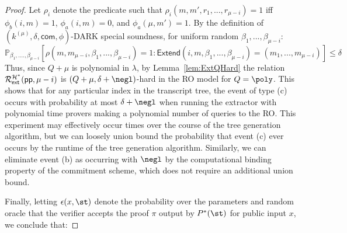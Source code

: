 \begin{proof}
	 
	 Let $\rho_i$ denote the predicate such that $\rho_i(m, m', r_1,...,r_{\mu - i}) = 1 $ iff $\phi_b(i, m) = 1$, $\phi_a(i, m) = 0$, and $\phi_a(\mu, m') = 1$. By the definition of $(k^{(\mu)}, \delta, \textsf{com} , \phi)$-DARK special soundness, for uniform random $\beta_1,...,\beta_{\mu -i}$: 
	 $$\mathbb{P}_{\beta_1,....,\beta_{\mu -i}}[\rho(m, m_{\mu - i},\beta_1,...,\beta_{\mu - i}) = 1 : \textsf{Extend}(i,m,\beta_1,...,\beta_{\mu-i}) = (m_1,...,m_{\mu - i})] \leq \delta $$ 
	 Thus, since $Q+\mu$ is polynomial in $\lambda$, by Lemma~\ref{lem:ExtQHard} the relation $\mathcal{R}^{\mathcal{H^*}}_\textsf{ext}(\textsf{pp}, \mu - i)$ is $(Q+\mu, \delta + \negl)$-hard in the RO model for $Q = \poly$. This shows that for any particular index in the transcript tree, the event of type (c) occurs with probability at most $\delta +\negl$ when running the extractor with polynomial time provers making a polynomial number of queries to the RO. This experiment may effectively occur times over the course of the tree generation algorithm, but we can loosely union bound the probability that event (c) ever occurs by the runtime of the tree generation algorithm. Similarly, we can eliminate event (b) as occurring with $\negl$ by the computational binding property of the commitment scheme, which does not require an additional union bound.  
	 
	 Finally, letting $\epsilon(x, \st)$ denote the probability over the parameters and random oracle that the verifier accepts the proof $\pi$ output by $P^*(\st)$ for public input $x$, we conclude that: 
	

\end{proof}
